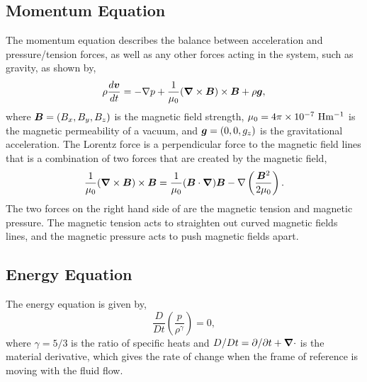 \subsection{Momentum Equation}
\label{section:cont_eq}
The momentum equation describes the balance between acceleration and pressure/tension forces, as well as any other forces acting in the system, such as gravity, as shown by,
\begin{equation}\label{eq87}
\rho \frac{d \boldsymbol{v}}{dt} = - \nabla p + \frac{1}{\mu_0} (\boldsymbol{\nabla} \times \boldsymbol{B}) \times \boldsymbol{B} + \rho \boldsymbol{g},
\end{equation}
where $\boldsymbol{B}=(B_x,B_y,B_z)$ is the magnetic field strength, $\mu_0=4 \pi \times 10^{-7}~\rm{Hm^{-1}}$ is the magnetic permeability of a vacuum, and $\boldsymbol{g} = (0,0,g_z)$ is the gravitational acceleration. The Lorentz force is a perpendicular force to the magnetic field lines that is a combination of two forces that are created by the magnetic field,
\begin{equation}\label{lor_for} 
    \frac{1}{\mu_0}(\boldsymbol{\nabla}\times \boldsymbol{B})\times \boldsymbol{B} = \frac{1}{\mu_0}( \boldsymbol{B} \cdot \boldsymbol{\nabla}) \boldsymbol{B} - \nabla\left(\frac{ \boldsymbol{B}^2}{2\mu_0}\right).
\end{equation}
The two forces on the right hand side of  are the magnetic tension and magnetic pressure. The magnetic tension acts to straighten out curved magnetic fields lines, and the magnetic pressure acts to push magnetic fields apart.    %
\subsection{Energy Equation}
\label{section:cont_eq}
The energy equation is given by, 
\begin{equation}\label{eq88}
\frac{D}{D t} \left( \frac{p}{\rho^{\gamma}} \right) = 0,
\end{equation}
where $\gamma=5/3$ is the ratio of specific heats and $D/Dt = \partial/\partial t+\boldsymbol{\nabla} \cdot$ is the material derivative, which gives the rate of change when the frame of reference is moving with the fluid flow.
